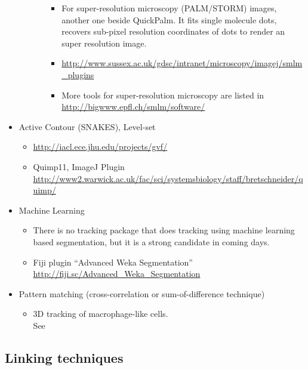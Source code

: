 \documentclass[11pnt]{article}
\begin{document}
\begin{itemize}
\begin{itemize}
\begin{itemize}
\begin{itemize}
          \item For super-resolution microscopy (PALM/STORM) images, another one beside QuickPalm. It fits single molecule dots, recovers sub-pixel resolution coordinates of dots to render an super resolution image.
          \item \url{http://www.sussex.ac.uk/gdsc/intranet/microscopy/imagej/smlm_plugins}
          \item More tools for super-resolution microscopy are listed in \url{http://bigwww.epfl.ch/smlm/software/}
      \end{itemize}
\end{itemize}
\end{itemize}
\item Active Contour (SNAKES), Level-set
\begin{itemize} 
\item \url{http://iacl.ece.jhu.edu/projects/gvf/}
\item Quimp11, ImageJ Plugin\\ \url{http://www2.warwick.ac.uk/fac/sci/systemsbiology/staff/bretschneider/quimp/}
\end{itemize}
\item Machine Learning
\begin{itemize}
\item There is no tracking package that does tracking using machine learning based segmentation, but it is a strong candidate in coming days. 
\item Fiji plugin ``Advanced Weka Segmentation''\\
\url{http://fiji.sc/Advanced_Weka_Segmentation}
\end{itemize}
\item Pattern matching (cross-correlation or sum-of-difference technique)
\begin{itemize}
\item 3D tracking of macrophage-like cells. \\See \cite{Grabher2007}
\end{itemize}
\end{itemize}

\subsection{Linking techniques}
\end{document}
